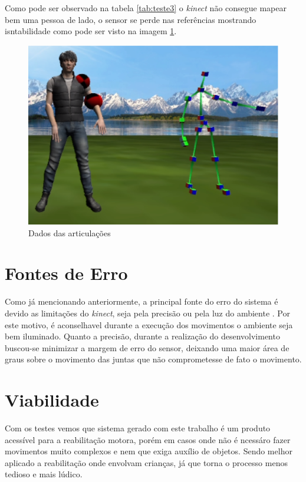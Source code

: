 Como pode ser observado na tabela \ref{tab:teste3} o \textit{kinect} não consegue mapear bem uma pessoa de lado, o sensor se perde nas referências mostrando isntabilidade como pode ser
visto na imagem \ref{img:teste3}.

\begin{figure}[H]
\centering
\includegraphics [keepaspectratio=true,scale=0.60]{figuras/img2teste1.eps}
\caption{Dados das articulações}
\label{img:teste3}
\end{figure}

\section{Fontes de Erro}\label{sol:fontesErro}
  Como já mencionando anteriormente, a principal fonte do erro do sistema é devido as limitações do \textit{kinect}, seja pela precisão ou pela luz do ambiente
. Por este motivo, é aconselhavel durante a execução dos movimentos o ambiente seja bem iluminado. Quanto a precisão,
durante a realização do desenvolvimento buscou-se minimizar a margem de erro do sensor, deixando uma maior área de graus sobre o movimento das juntas que não comprometesse de fato o movimento.

\section{Viabilidade}\label{sol:viabilidade}
  Com os testes vemos que sistema gerado com este trabalho é um produto acessível para a reabilitação motora, porém em casos onde não é ncessáro
fazer movimentos muito complexos e nem que exiga auxílio de objetos. Sendo melhor aplicado a reabilitação onde envolvam crianças, já que torna o processo
menos tedioso e mais lúdico.
